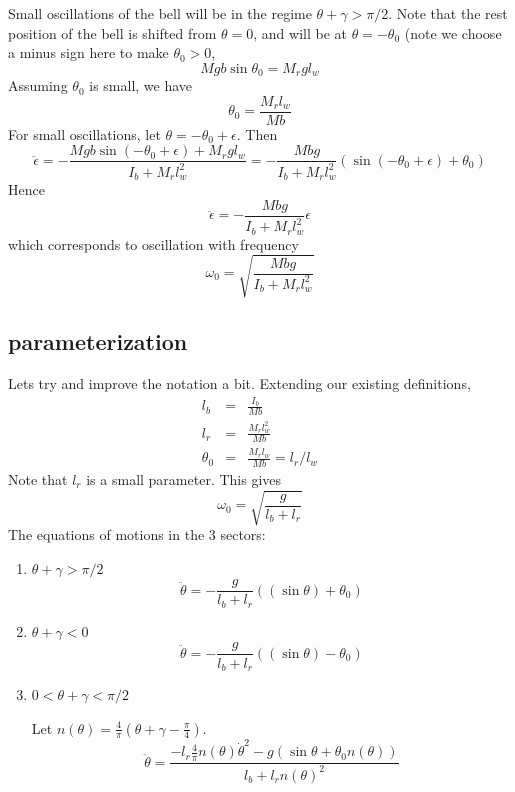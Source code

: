 \documentclass{article}
\begin{document}
Small oscillations of the bell will be in the regime $\theta+\gamma > \pi/2$. Note that the rest position of the bell
is shifted from $\theta=0$, and will be at $\theta = -\theta_0$ (note we choose a minus sign here to make $\theta_0 > 0$,
\begin{equation}
Mgb \sin \theta_0 = M_r g l_w
\end{equation}
Assuming $\theta_0$ is small, we have
\begin{equation}
\theta_0 = \frac{M_r l_w}{Mb}
\end{equation}
For small oscillations, let $\theta = -\theta_0 + \epsilon$. Then
\begin{equation}
\ddot{\epsilon} = - \frac{Mgb \sin (-\theta_0 + \epsilon) + M_r g l_w}{I_b + M_r l_w^2} 
= -\frac{Mbg}{I_b + M_r l_w^2} \left( \sin(-\theta_0 + \epsilon) + \theta_0\right)
\end{equation}
Hence
\begin{equation}
\ddot{\epsilon} = -\frac{Mbg}{I_b + M_r l_w^2} \epsilon
\end{equation}
which corresponds to oscillation with frequency
\begin{equation}
\omega_0 = \sqrt{\frac{Mbg}{I_b + M_r l_w^2}}
\end{equation}

\subsection{parameterization}

Lets try and improve the notation a bit. Extending our existing definitions,
\begin{eqnarray}
l_b &=& \frac{I_b}{Mb} \\
l_r &=& \frac{M_r l_w^2}{Mb}\\
\theta_0 &=& \frac{M_r l_w}{Mb} = l_r / l_w
\end{eqnarray}
Note that $l_r$ is a small parameter. This gives
\begin{equation}
\omega_0 = \sqrt{\frac{g}{l_b + l_r}}
\end{equation}
The equations of motions in the 3 sectors:
\begin{enumerate}
\item $\theta+\gamma > \pi/2$
\begin{equation}
\ddot{\theta} = -\frac{g}{l_b + l_r} \left( (\sin \theta) + \theta_0 \right)
\end{equation}

\item $\theta+\gamma < 0$
\begin{equation}
\ddot{\theta} = -\frac{g}{l_b + l_r} \left( (\sin \theta) - \theta_0 \right)
\end{equation}

\item $0 < \theta+\gamma < \pi/2$

Let $n(\theta) = \frac{4}{\pi}(\theta + \gamma - \frac{\pi}{4})$. 
\begin{equation}
\ddot{\theta} = \frac{ -l_r \frac{4}{\pi} n(\theta) \dot{\theta}^2 - g (\sin \theta + \theta_0 n(\theta)) }
{ l_b + l_r n(\theta)^2 }
\end{equation}

\end{enumerate}
\end{document}
